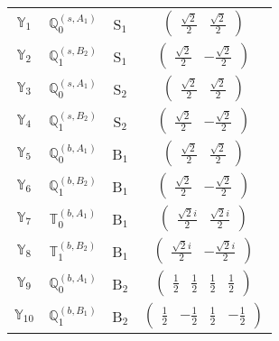 \documentclass[fleqn,10pt,landscape]{article}
\begin{document}
\begin{itemize}
\begin{center}
\begin{longtable}{c|c|c|c}
$ \mathbb{Y}_{1} $ & $\mathbb{Q}_{0}^{(s,A_{1})}$ & S$_{1}$ & $\begin{pmatrix} \frac{\sqrt{2}}{2} & \frac{\sqrt{2}}{2} \end{pmatrix}$ \\
$ \mathbb{Y}_{2} $ & $\mathbb{Q}_{1}^{(s,B_{2})}$ & S$_{1}$ & $\begin{pmatrix} \frac{\sqrt{2}}{2} & - \frac{\sqrt{2}}{2} \end{pmatrix}$ \\ \hline
$ \mathbb{Y}_{3} $ & $\mathbb{Q}_{0}^{(s,A_{1})}$ & S$_{2}$ & $\begin{pmatrix} \frac{\sqrt{2}}{2} & \frac{\sqrt{2}}{2} \end{pmatrix}$ \\
$ \mathbb{Y}_{4} $ & $\mathbb{Q}_{1}^{(s,B_{2})}$ & S$_{2}$ & $\begin{pmatrix} \frac{\sqrt{2}}{2} & - \frac{\sqrt{2}}{2} \end{pmatrix}$ \\ \hline
$ \mathbb{Y}_{5} $ & $\mathbb{Q}_{0}^{(b,A_{1})}$ & B$_{1}$ & $\begin{pmatrix} \frac{\sqrt{2}}{2} & \frac{\sqrt{2}}{2} \end{pmatrix}$ \\
$ \mathbb{Y}_{6} $ & $\mathbb{Q}_{1}^{(b,B_{2})}$ & B$_{1}$ & $\begin{pmatrix} \frac{\sqrt{2}}{2} & - \frac{\sqrt{2}}{2} \end{pmatrix}$ \\
$ \mathbb{Y}_{7} $ & $\mathbb{T}_{0}^{(b,A_{1})}$ & B$_{1}$ & $\begin{pmatrix} \frac{\sqrt{2} i}{2} & \frac{\sqrt{2} i}{2} \end{pmatrix}$ \\
$ \mathbb{Y}_{8} $ & $\mathbb{T}_{1}^{(b,B_{2})}$ & B$_{1}$ & $\begin{pmatrix} \frac{\sqrt{2} i}{2} & - \frac{\sqrt{2} i}{2} \end{pmatrix}$ \\ \hline
$ \mathbb{Y}_{9} $ & $\mathbb{Q}_{0}^{(b,A_{1})}$ & B$_{2}$ & $\begin{pmatrix} \frac{1}{2} & \frac{1}{2} & \frac{1}{2} & \frac{1}{2} \end{pmatrix}$ \\
$ \mathbb{Y}_{10} $ & $\mathbb{Q}_{1}^{(b,B_{1})}$ & B$_{2}$ & $\begin{pmatrix} \frac{1}{2} & - \frac{1}{2} & \frac{1}{2} & - \frac{1}{2} \end{pmatrix}$ \\

\end{longtable}
\end{center}
\end{itemize}
\end{document}

